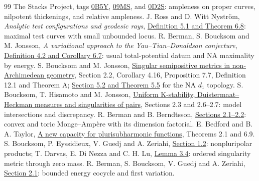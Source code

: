 \documentclass[11pt]{article}
\begin{document}
\begin{thebibliography}{99}
 The Stacks Project, tags
\href{https://stacks.math.columbia.edu/tag/0B5Y}{0B5Y},
\href{https://stacks.math.columbia.edu/tag/09MS}{09MS}, and
\href{https://stacks.math.columbia.edu/tag/0D2S}{0D2S}:
ampleness on proper curves, nilpotent thickenings, and relative ampleness.
 J. Ross and D. Witt Nystr\"om,
\emph{Analytic test configurations and geodesic rays},
\href{https://arxiv.org/pdf/1101.1612}{Definition 5.1 and Theorem 6.8}:
maximal test curves with small unbounded locus.
 R. Berman, S. Boucksom and M. Jonsson,
\emph{A variational approach to the Yau--Tian--Donaldson conjecture},
\href{https://arxiv.org/pdf/1509.04561}{Definition 4.2 and Corollary 6.7}:
usual total-potential datum and NA maximality by energy.
 S. Boucksom and M. Jonsson,
\href{https://arxiv.org/pdf/1801.08229}{Singular semipositive metrics
in non-Archimedean geometry}, Section 2.2, Corollary 4.16,
Proposition 7.7, Definition 12.1 and Theorem A;
\href{https://arxiv.org/pdf/2107.11221}{Section 5.2 and Theorem 5.5}
for the NA $d_1$ topology.
 S. Boucksom, T. Hisamoto and M. Jonsson,
\href{https://www.math.nagoya-u.ac.jp/~hisamoto/papers/BHJ2_16.pdf}
{Uniform K-stability, Duistermaat--Heckman measures and singularities
of pairs}, Sections 2.3 and 2.6--2.7: model intersections and discrepancy.
 R. Berman and B. Berndtsson,
\href{https://arxiv.org/pdf/1207.6128}{Sections 2.1--2.2}:
convex and toric Monge--Amp\`ere with its dimension factorial.
 E. Bedford and B. A. Taylor,
\href{https://www.math.stonybrook.edu/~ebedford/PapersForM655/BTNewCapacity.pdf}
{A new capacity for plurisubharmonic functions}, Theorems 2.1 and 6.9.
 S. Boucksom, P. Eyssidieux, V. Guedj and A. Zeriahi,
\href{https://arxiv.org/pdf/0812.3674}{Section 1.2}:
nonpluripolar products; T. Darvas, E. Di Nezza and C. H. Lu,
\href{https://arxiv.org/pdf/1909.00839}{Lemma 3.4}:
ordered singularity metric through zero mass.
 R. Berman, S. Boucksom, V. Guedj and A. Zeriahi,
\href{https://arxiv.org/pdf/0907.4490}{Section 2.1}:
bounded energy cocycle and first variation.
\end{thebibliography}
\end{document}
